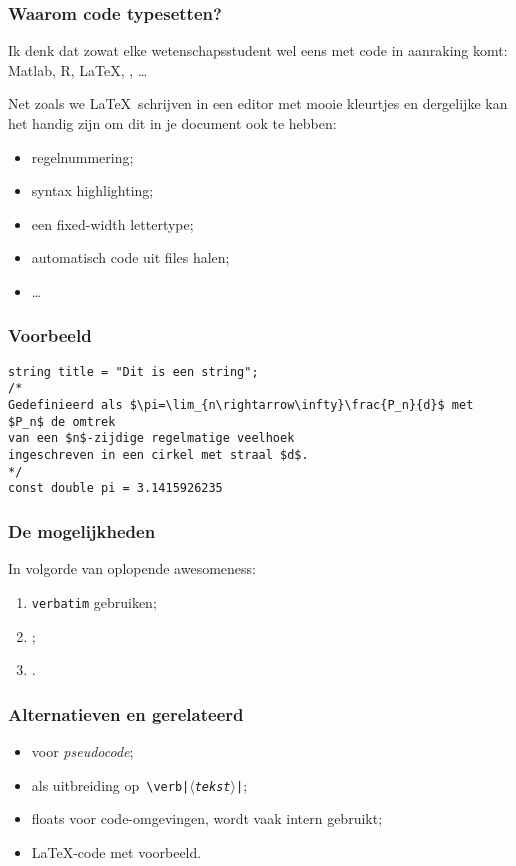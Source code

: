 \begin{frame}
  \frametitle{Waarom code typesetten?}

  Ik denk dat zowat elke wetenschapsstudent wel eens met code in aanraking komt: Matlab, R, \LaTeX, \cpp, \ldots

  Net zoals we \LaTeX\ schrijven in een editor met mooie kleurtjes en dergelijke kan het handig zijn om dit in je document ook te hebben:
  \begin{itemize}
    \item regelnummering;
    \item syntax highlighting;
    \item een fixed-width lettertype;
    \item automatisch code uit files halen;
    \item \ldots
  \end{itemize}
\end{frame}

\begin{frame}[fragile]
  \frametitle{Voorbeeld}

\begin{verbatim}
string title = "Dit is een string";
/*
Gedefinieerd als $\pi=\lim_{n\rightarrow\infty}\frac{P_n}{d}$ met $P_n$ de omtrek
van een $n$-zijdige regelmatige veelhoek
ingeschreven in een cirkel met straal $d$.
*/
const double pi = 3.1415926235
\end{verbatim}
\end{frame}

\begin{frame}
  \frametitle{De mogelijkheden}

  In volgorde van oplopende awesomeness:
  \begin{enumerate}
    \item \texttt{verbatim} gebruiken;
    \item {};
    \item {}.
  \end{enumerate}
\end{frame}

\begin{frame}
  \frametitle{Alternatieven en gerelateerd}

  \begin{itemize}
    \item {} voor \emph{pseudocode};
    \item {} als uitbreiding op~\texttt{\textcolor{uagreen}{\textbackslash verb}|$\langle$\textsl{tekst}$\rangle$|};
    \item {} floats voor code-omgevingen, wordt vaak intern gebruikt;
    \item {} \LaTeX-code met voorbeeld.
  \end{itemize}
\end{frame}

